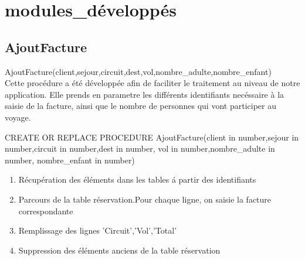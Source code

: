 \section{modules\_d\'evelopp\'es}

\subsection{AjoutFacture}

AjoutFacture(client,sejour,circuit,dest,vol,nombre\_adulte,nombre\_enfant)\\
Cette proc\'edure a \'et\'e d\'evelopp\'ee afin de faciliter le traitement au niveau de notre application.
Elle prends en parametre les diff\'erents identifiants nec\'essaire \`a la saisie de la facture, ainsi que le nombre de personnes qui vont participer au voyage.\\
\small

CREATE OR REPLACE PROCEDURE AjoutFacture(client in number,sejour in number,circuit in number,dest in number, vol in number,nombre\_adulte in number, nombre\_enfant in number) \\
\begin{enumerate}[1]
\item R\'ecup\'eration des \'el\'ements dans les tables \'a partir des identifiants
\item Parcours de la table r\'eservation.Pour chaque ligne, on saisie la facture correspondante
\item Remplissage des lignes 'Circuit','Vol','Total'
\item Suppression des \'el\'ements anciens de la table r\'eservation

\end{enumerate}



\normalsize



\newpage
